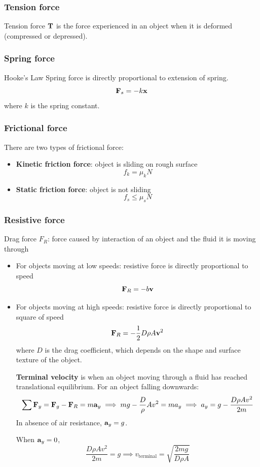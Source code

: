 \subsubsection{Tension force}
Tension force $\vb{T}$ is the force experienced in an object when it is deformed (compressed or depressed).

\subsubsection{Spring force}
\begin{thrm}{Hooke's Law}{}
Spring force is directly proportional to extension of spring.
\begin{equation}
\vb{F}_s = -k\vb{x}
\end{equation}
where $k$ is the spring constant.
\end{thrm}

\subsubsection{Frictional force}
There are two types of frictional force:
\begin{itemize}
\item \textbf{Kinetic friction force}: object is sliding on rough surface
\[ f_k = \mu_k N \]
\item \textbf{Static friction force}: object is not sliding
\[ f_s \le \mu_s N \]
\end{itemize}

\subsubsection{Resistive force}
Drag force $F_R$: force caused by interaction of an object and the fluid it is moving through
\begin{itemize}
\item For objects moving at low speeds: resistive force is directly proportional to speed
\begin{equation}
\vb{F}_R = -b\vb{v}
\end{equation}

\item For objects moving at high speeds: resistive force is directly proportional to square of speed
\begin{equation}
\vb{F}_R = -\frac{1}{2}D\rho A\vb{v}^2
\end{equation}
where $D$ is the drag coefficient, which depends on the shape and surface texture of the object.

\textbf{Terminal velocity} is when an object moving through a fluid has reached translational equilibrium. For an object falling downwards:
\[ \sum \vb{F}_y = \vb{F}_g-\vb{F}_R = m\vb{a}_y \implies mg-\frac{D}{\rho}Av^2 = ma_y \implies a_y = g-\frac{D\rho Av^2}{2m} \]
In absence of air resistance, $\vb{a}_y=g$.

When $\vb{a}_y=0$,
\[ \frac{D\rho Av^2}{2m} = g \implies \boxed{v_\text{terminal} = \sqrt{\frac{2mg}{D\rho A}}} \]
\end{itemize}
\pagebreak

